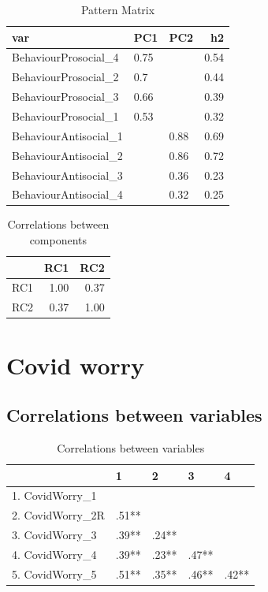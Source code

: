 \documentclass[]{article}
\begin{document}
\begin{table}[H]

\caption{\label{tab:unnamed-chunk-66}Pattern Matrix}
\centering
\fontsize{6}{8}\selectfont
\begin{tabular}[t]{lllr}
\toprule
var & PC1 & PC2 & h2\\
\midrule
BehaviourProsocial\_4 & 0.75 &  & 0.54\\
BehaviourProsocial\_2 & 0.7 &  & 0.44\\
BehaviourProsocial\_3 & 0.66 &  & 0.39\\
BehaviourProsocial\_1 & 0.53 &  & 0.32\\
BehaviourAntisocial\_1 &  & 0.88 & 0.69\\
\addlinespace
BehaviourAntisocial\_2 &  & 0.86 & 0.72\\
BehaviourAntisocial\_3 &  & 0.36 & 0.23\\
BehaviourAntisocial\_4 &  & 0.32 & 0.25\\
\bottomrule
\end{tabular}
\end{table}

\begin{table}[H]

\caption{\label{tab:unnamed-chunk-66}Correlations between components}
\centering
\fontsize{6}{8}\selectfont
\begin{tabular}[t]{lrr}
\toprule
  & RC1 & RC2\\
\midrule
RC1 & 1.00 & 0.37\\
RC2 & 0.37 & 1.00\\
\bottomrule
\end{tabular}
\end{table}

\newpage

\hypertarget{covid-worry}{%
\section{Covid worry}\label{covid-worry}}

\hypertarget{correlations-between-variables-13}{%
\subsection{Correlations between
variables}\label{correlations-between-variables-13}}

\begin{table}[H]

\caption{\label{tab:unnamed-chunk-67}Correlations between variables}
\centering
\fontsize{6}{8}\selectfont
\begin{tabular}[t]{lllll}
\toprule
  & 1 & 2 & 3 & 4\\
\midrule
1. CovidWorry\_1 &  &  &  & \\
2. CovidWorry\_2R & .51** &  &  & \\
3. CovidWorry\_3 & .39** & .24** &  & \\
4. CovidWorry\_4 & .39** & .23** & .47** & \\
5. CovidWorry\_5 & .51** & .35** & .46** & .42**\\
\bottomrule
\end{tabular}
\end{table}
\end{document}
